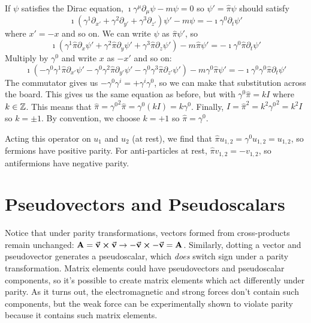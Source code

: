 \documentclass[a4paper,twoside,master.tex]{subfiles}
\begin{document}
If $\psi$ satisfies the Dirac equation, $ \imath \gamma^{\mu} \partial_{\mu} \psi - m \psi = 0 $ so $ \psi' = \hat{\pi} \psi $ should satisfy
\begin{equation}
    \imath \left( \gamma^1 \partial_{x'} + \gamma^2 \partial_{y'} + \gamma^3 \partial_{z'} \right) \psi' - m \psi = - \imath \gamma^0 \partial_t \psi'
\end{equation}
where $ x' = -x $ and so on. We can write $\psi$ as $ \hat{\pi} \psi' $, so
\begin{equation}
    \imath \left( \gamma^1 \hat{\pi} \partial_x \psi' + \gamma^2 \hat{\pi} \partial_y \psi' + \gamma^3 \hat{\pi} \partial_z \psi' \right) - m \hat{\pi} \psi' = - \imath \gamma^0 \hat{\pi} \partial_t \psi'
\end{equation}
Multiply by $ \gamma^0 $ and write $ x $ as $ -x' $ and so on:
\begin{equation}
    \imath \left( - \gamma^0 \gamma^1 \hat{\pi} \partial_{x'} \psi' - \gamma^0 \gamma^2 \hat{\pi} \partial_{y'} \psi' - \gamma^0 \gamma^3 \hat{\pi} \partial_{z'} \psi' \right) - m \gamma^0 \hat{\pi} \psi' = - \imath \gamma^0 \gamma^0 \hat{\pi} \partial_t \psi'
\end{equation}
The commutator gives us $ - \gamma^0 \gamma^i = + \gamma^i \gamma^0 $, so we can make that substitution across the board. This gives us the same equation as before, but with $ \gamma^0 \hat{\pi} = kI $ where $ k \in \mathbb{Z} $. This means that $ \hat{\pi} = {\gamma^0}^2 \hat{\pi} = \gamma^{0} (k I) = k \gamma^0 $. Finally, $ I = \hat{\pi}^2 = k^2 {\gamma^0}^2 = k^2 I $ so $ k = \pm 1 $. By convention, we choose $ k = +1 $ so $ \hat{\pi} = \gamma^0 $.

Acting this operator on $ u_1 $ and $ u_2 $ (at rest), we find that $ \hat{\pi} u_{1,2} = \gamma^0 u_{1,2} = u_{1,2} $, so fermions have positive parity. For anti-particles at rest, $ \hat{\pi} v_{1,2} = - v_{1,2} $, so antifermions have negative parity.


\section{Pseudovectors and Pseudoscalars}\label{sec:pseudovectors_and_pseudoscalars}

Notice that under parity transformations, vectors formed from cross-products remain unchanged: $ \vb{A} = \va{v} \cross \va{v} \to - \va{v} \cross - \va{v} = \vb{A} $. Similarly, dotting a vector and pseudovector generates a pseudoscalar, which \textit{does} switch sign under a parity transformation. Matrix elements could have pseudovectors and pseudoscalar components, so it's possible to create matrix elements which act differently under parity. As it turns out, the electromagnetic and strong forces don't contain such components, but the weak force can be experimentally shown to violate parity because it contains such matrix elements.
\end{document}
